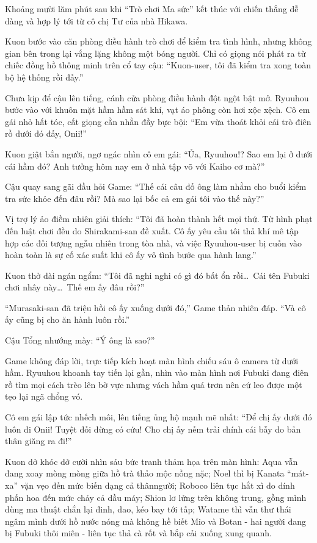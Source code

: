 \documentclass[../main.tex]{subfiles}
\begin{document}
\omk

Khoảng mười lăm phút sau khi ``Trò chơi Ma sức'' kết thúc với chiến thắng dễ dàng và hợp lý tới từ cô chị Tư của nhà Hikawa.

Kuon bước vào căn phòng điều hành trò chơi để kiểm tra tình hình, nhưng không gian bên trong lại vắng lặng không một bóng người. Chỉ có giọng nói phát ra từ chiếc đồng hồ thông minh trên cổ tay cậu: ``Kuon-user, tôi đã kiểm tra xong toàn bộ hệ thống rồi đấy.''

Chưa kịp để cậu lên tiếng, cánh cửa phòng điều hành đột ngột bật mở. Ryuuhou bước vào với khuôn mặt hầm hầm sát khí, vạt áo phông còn hơi xộc xệch. Cô em gái nhỏ hất tóc, cất giọng cằn nhằn đầy bực bội: ``Em vừa thoát khỏi cái trò điên rồ dưới đó đấy, Onii!''

Kuon giật bắn người, ngơ ngác nhìn cô em gái: ``Ủa, Ryuuhou!? Sao em lại ở dưới cái hầm đó? Anh tưởng hôm nay em ở nhà tập võ với Kaiho cơ mà?''

Cậu quay sang gãi đầu hỏi Game: ``Thế cái câu đố ông làm nhằm cho buổi kiểm tra sức khỏe đến đâu rồi? Mà sao lại bốc cả em gái tôi vào thế này?''

Vị trợ lý ảo điềm nhiên giải thích: ``Tôi đã hoàn thành hết mọi thứ. Từ hình phạt đến luật chơi đều do Shirakami-san đề xuất. Cô ấy yêu cầu tôi thả khí mê tập hợp các đối tượng ngẫu nhiên trong tòa nhà, và việc Ryuuhou-user bị cuốn vào hoàn toàn là sự cố xác suất khi cô ấy vô tình bước qua hành lang.''

Kuon thở dài ngán ngẩm: ``Tôi đã nghi nghi có gì đó bất ổn rồi\dots\ Cái tên Fubuki chơi nhây này\dots\ Thế em ấy đâu rồi?''

``Murasaki-san đã triệu hồi cô ấy xuống dưới đó,'' Game thản nhiên đáp. ``Và cô ấy cũng bị cho ăn hành luôn rồi.''

Cậu Tổng nhướng mày: ``Ý ông là sao?''

Game không đáp lời, trực tiếp kích hoạt màn hình chiếu sáu ô camera từ dưới hầm. Ryuuhou khoanh tay tiến lại gần, nhìn vào màn hình nơi Fubuki đang điên rồ tìm mọi cách trèo lên bờ vực nhưng vách hầm quá trơn nên cứ leo được một tẹo lại ngã chổng vó.

Cô em gái lập tức nhếch môi, lên tiếng ủng hộ mạnh mẽ nhất: ``Để chị ấy dưới đó luôn đi Onii! Tuyệt đối đừng có cứu! Cho chị ấy nếm trải chính cái bẫy do bản thân giăng ra đi!''

Kuon dở khóc dở cười nhìn sáu bức tranh thảm họa trên màn hình: Aqua vẫn đang xoay mòng mòng giữa hồ trà thảo mộc nồng nặc; Noel thì bị Kanata ``mát-xa'' vặn vẹo đến mức biến dạng cả thânngười; Roboco liên tục hắt xì do dính phấn hoa đến mức chảy cả dầu máy; Shion lơ lửng trên không trung, gồng mình dùng ma thuật chắn lại đinh, dao, kéo bay tới tấp; Watame thì vẫn thư thái ngâm mình dưới hồ nước nóng mà không hề biết Mio và Botan - hai người đang bị Fubuki thôi miên - liên tục thả cà rốt và bắp cải xuống xung quanh.
\end{document}

